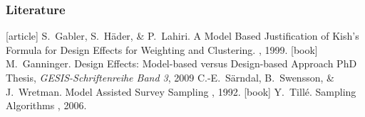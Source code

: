 \documentclass[10pt]{beamer}\usepackage[]{graphicx}\usepackage[]{color}
\begin{document}
\begin{frame}[allowframebreaks]\frametitle{Literature}    
  \begin{thebibliography}{10}    
   [article]
  S.~Gabler, S.~H\"{a}der, \& P.~Lahiri.
    \newblock  A Model Based Justification of
Kish's Formula for Design Effects for Weighting and Clustering.
    , 1999.
  [book]
   M.~Ganninger.
  \newblock  Design Effects: Model-based versus Design-based Approach
  \newblock  PhD Thesis, {\em GESIS-Schriftenreihe Band 3}, 2009
    C.-E.~S\"{a}rndal, B.~Swensson, \& J.~Wretman.
    \newblock Model Assisted Survey Sampling
    , 1992.
    [book]
   Y.~Till\'{e}.
  \newblock  Sampling Algorithms
    , 2006.
  \end{thebibliography}
\end{frame} 
\end{document}
